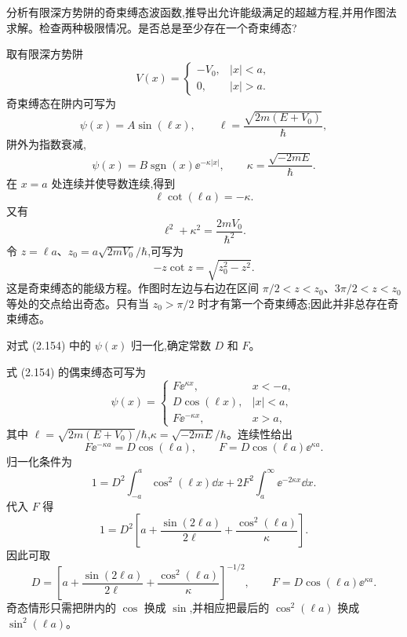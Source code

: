 \begin{question}
分析有限深方势阱的奇束缚态波函数,推导出允许能级满足的超越方程,并用作图法求解。检查两种极限情况。是否总是至少存在一个奇束缚态?
\end{question}
\begin{solution}
取有限深方势阱
\[
V(x)=\begin{cases}-V_0,& |x|<a,\\0,& |x|>a.
\end{cases}
\]
奇束缚态在阱内可写为
\[
\psi(x)=A\sin(\ell x),
\qquad
\ell=\frac{\sqrt{2m(E+V_0)}}{\hbar},
\]
阱外为指数衰减,
\[
\psi(x)=B\operatorname{sgn}(x)\ee^{-\kappa |x|},
\qquad
\kappa=\frac{\sqrt{-2mE}}{\hbar}.
\]
在 $x=a$ 处连续并使导数连续,得到
\[
\ell\cot(\ell a)=-\kappa.
\]
又有
\[
\ell^2+\kappa^2=\frac{2mV_0}{\hbar^2}.
\]
令 $z=\ell a$、$z_0=a\sqrt{2mV_0}/\hbar$,可写为
\[
-z\cot z=\sqrt{z_0^2-z^2}.
\]
这是奇束缚态的能级方程。作图时左边与右边在区间 $\pi/2<z<z_0$、$3\pi/2<z<z_0$ 等处的交点给出奇态。只有当 $z_0>\pi/2$ 时才有第一个奇束缚态;因此并非总存在奇束缚态。
\end{solution}

\begin{question}
对式 (2.154) 中的 $\psi(x)$ 归一化,确定常数 $D$ 和 $F$。

\par\smallskip
{}

\end{question}
\begin{solution}
式 (2.154) 的偶束缚态可写为
\[
\psi(x)=\begin{cases}
F \ee^{\kappa x},&x<-a,\\
D\cos(\ell x),& |x|<a,\\
F \ee^{-\kappa x},&x>a,
\end{cases}
\]
其中 $\ell=\sqrt{2m(E+V_0)}/\hbar$,$\kappa=\sqrt{-2mE}/\hbar$。连续性给出
\[
F \ee^{-\kappa a}=D\cos(\ell a),
\qquad
F=D\cos(\ell a)\ee^{\kappa a}.
\]
归一化条件为
\[
1=D^2\int_{-a}^{a}\cos^2(\ell x)\dd x
+2F^2\int_a^\infty \ee^{-2\kappa x}\dd x.
\]
代入 $F$ 得
\[
1=D^2\left[a+\frac{\sin(2\ell a)}{2\ell}+\frac{\cos^2(\ell a)}{\kappa}\right].
\]
因此可取
\[
D=\left[a+\frac{\sin(2\ell a)}{2\ell}+\frac{\cos^2(\ell a)}{\kappa}\right]^{-1/2},
\qquad
F=D\cos(\ell a)\ee^{\kappa a}.
\]
奇态情形只需把阱内的 $\cos$ 换成 $\sin$,并相应把最后的 $\cos^2(\ell a)$ 换成 $\sin^2(\ell a)$。
\end{solution}

